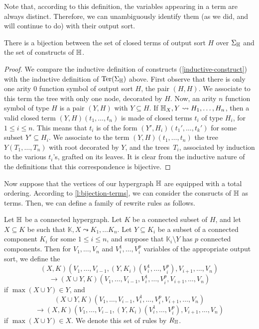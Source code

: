 \begin{rem}
  Note that, according to this definition, the variables appearing in a term are always distinct. 
  Therefore, we can unambiguously identify them (as we did, and will continue to do) with their output sort.
\end{rem}

\begin{lemma} \label{l:bijection-terms}
  There is a bijection between the set of closed terms of output sort $H$ over $\Sigma_{\mathbb H}$ and the set of constructs of ${\mathbb H}$.
\end{lemma}

\begin{proof}
  We compare the inductive definition of constructs (\cref{inductive-construct}) with the inductive definition of $\operatorname{Ter}(\Sigma_{\mathbb H})$ above.
  First observe that there is only one arity $0$ function symbol of output sort $H$, the pair $(H,H)$. 
  We associate to this term the tree with only one node, decorated by $H$.
  Now, an arity $n$ function symbol of type $H$ is a pair $(Y,H)$ with $Y \subseteq H$. 
  If ${\mathbb H}_X,Y \leadsto H_1,\ldots,H_n$, then a valid closed term $(Y,H)(t_1,\ldots,t_n)$ is made of closed terms $t_i$ of type $H_i$, for $1 \leq i \leq n$. 
  This means that $t_i$ is of the form $(Y',H_i)(t_1',\ldots,t_k')$ for some subset $Y' \subseteq H_i$. 
  We associate to the term $(Y,H)(t_1,\ldots,t_n)$ the tree $Y(T_1,\ldots,T_n)$ with root decorated by $Y$, and the trees~$T_i$, associated by induction to the various $t_i$'s, grafted on its leaves.
  It is clear from the inductive nature of the definitions that this correspondence is bijective.
\end{proof}

Now suppose that the vertices of our hypergraph ${\mathbb H}$ are equipped with a total ordering.
According to \cref{l:bijection-terms}, we can consider the consructs of ${\mathbb H}$ as terms. 
Then, we can define a family of rewrite rules as follows.

\begin{definition} \label{def:rules}
  Let ${\mathbb H}$ be a connected hypergraph. 
  Let $K$ be a connected subset of $H$, and let $X \subseteq K$ be such that $\mathbb{K},X \leadsto K_1,\ldots K_n$.
  Let $Y \subseteq K_i$ be a subset of a connected component $K_i$ for some $1 \leq i \leq n$, and suppose that $\mathbb{K}_i\setminus Y$ has $p$ connected components. 
  Then for $V_1,\ldots,V_n$ and $V_i^1,\ldots,V_i^p$ variables of the appropriate output sort, we define the 
  $$(X,K)(V_1,\ldots, V_{i-1},(Y,K_i)(V_i^1,\ldots, V_i^p),V_{i+1},\ldots,V_n)$$
  $$ \longrightarrow (X\cup Y,K)(V_1,\ldots,V_{i-1},V_i^1,\ldots, V_i^p,V_{i+1},\ldots,V_n)$$
  if $\max(X\cup Y)\in Y$, and 
  $$(X\cup Y,K)(V_1,\ldots,V_{i-1},V_i^1,\ldots, V_i^p,V_{i+1},\ldots,V_n)$$
  $$\longrightarrow (X,K)(V_1,\ldots, V_{i-1},(Y,K_i)(V_i^1,\ldots, V_i^p),V_{i+1},\ldots,V_n)$$
  if $\max(X\cup Y)\in X$.
  We denote this set of rules by $R_{\mathbb H}$.
\end{definition} 

